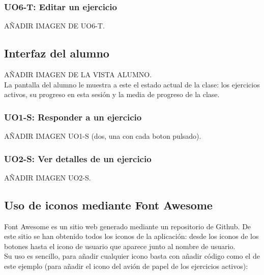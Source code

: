 \subsubsection{UO6-T: Editar un ejercicio}
\label{diseno-e-implementacion:interfaces:profesor:uo6-t}

AÑADIR IMAGEN DE UO6-T.\\

\subsection{Interfaz del alumno}
\label{diseno-e-implementacion:interfaces:alumno}

AÑADIR IMAGEN DE LA VISTA ALUMNO.\\

La pantalla del alumno le muestra a este el estado actual de la clase: los ejercicios activos, su progreso en esta sesión y la media de progreso de la clase.

\subsubsection{UO1-S: Responder a un ejercicio}
\label{diseno-e-implementacion:interfaces:alumno:uo1-s}

AÑADIR IMAGEN UO1-S (dos, una con cada boton pulsado).

\subsubsection{UO2-S: Ver detalles de un ejercicio}
\label{diseno-e-implementacion:interfaces:alumno:uo2-s}

AÑADIR IMAGEN UO2-S.

\subsection{Uso de iconos mediante Font Awesome}
\label{diseno-e-implementacion:interfaces:font-awesome}

Font Awesome \hyperref[fontawesome]{\cite{fontawesome}} es un sitio web generado mediante un repositorio de Github. De este sitio se han obtenido todos los iconos de la aplicación: desde los iconos de los botones hasta el icono de usuario que aparece junto al nombre de usuario.\\

Su uso es sencillo, para añadir cualquier icono basta con añadir código como el de este ejemplo (para añadir el icono del avión de papel de los ejercicios activos):\\

